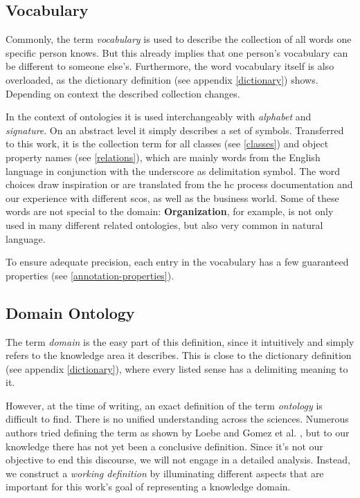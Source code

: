 \documentclass[a4paper, DIV=13, BCOR=0cm]{scrbook}
\begin{document}
\subsection{Vocabulary}
\label{vocabulary}
Commonly, the term \textit{vocabulary} is used to describe the collection of all words one specific person knows. But this already implies that one person's vocabulary can be different to someone else's. Furthermore, the word vocabulary itself is also overloaded, as the dictionary definition (see appendix \ref{dictionary}) shows. Depending on context the described collection changes. \cite{mw-dictionary}

In the context of ontologies it is used interchangeably with \textit{alphabet} and \textit{signature}. On an abstract level it simply describes a set of symbols. \cite[p.\,46]{loebe2015ontological} Transferred to this work, it is the collection term for all classes (see \ref{classes}) and object property names (see \ref{relations}), which are mainly words from the English language in conjunction with the underscore as delimitation symbol. The word choices draw inspiration or are translated from the \gls{hc} process documentation and our experience with different \glspl{sco}, as well as the business world. Some of these words are not special to the domain: \textbf{Organization}, for example, is not only used in many different related ontologies, but also very common in natural language.

To ensure adequate precision, each entry in the vocabulary has a few guaranteed properties (see \ref{annotation-properties}).

\subsection{Domain Ontology}
The term \textit{domain} is the easy part of this definition, since it intuitively and simply refers to the knowledge area it describes. \cite[p.\,7]{loebe2015ontological} This is close to the dictionary definition (see appendix \ref{dictionary}), where every listed sense has a delimiting meaning to it. \cite{mw-dictionary}

However, at the time of writing, an exact definition of the term \textit{ontology} is difficult to find. There is no unified understanding across the sciences. \cite{Hesse_2014} Numerous authors tried defining the term as shown by Loebe \cite[p.\,4-6]{loebe2015ontological} and Gomez et al. \cite[p.\, 6--9]{Gomez-Perez:2004aa}, but to our knowledge there has not yet been a conclusive definition. Since it's not our objective to end this discourse, we will not engage in a detailed analysis. Instead, we construct a \textit{working definition} by illuminating different aspects that are important for this work's goal of representing a knowledge domain.
\end{document}
